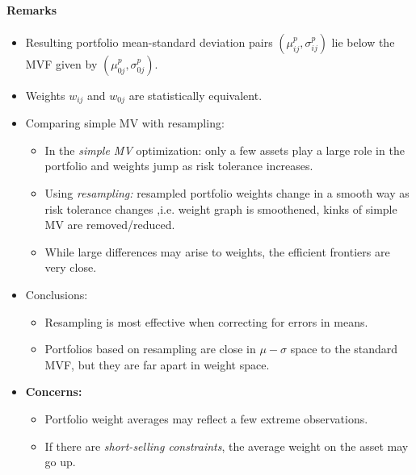 \documentclass[a4paper,landscape,8pt,fleqn]{scrartcl}
\renewcommand{\emph}[1]{\textbf{#1}}
\begin{document}
\begin{multicols*}{3}
\paragraph{Remarks}
\begin{itemize}
\item Resulting portfolio mean-standard deviation pairs $(\mu_{ij}^p, \sigma_{ij}^p)$ lie below the MVF given by $(\mu_{0j}^p, \sigma_{0j}^p)$.
\item Weights $w_{ij}$ and $w_{0j}$ are statistically equivalent.
\item Comparing simple MV with resampling:
\begin{itemize}
\item In the \textit{simple MV} optimization: only a few assets play a large role in the portfolio and weights jump as risk tolerance increases.
\item Using \textit{resampling:} resampled portfolio weights change in a smooth way as risk tolerance changes ,i.e. weight graph is smoothened, kinks of simple MV are removed/reduced.
\item While large differences may arise to weights, the efficient frontiers are very close.
\end{itemize}
\item Conclusions:
\begin{itemize}
\item Resampling is most effective when correcting for errors in means.
\item Portfolios based on resampling are close in $\mu-\sigma$ space to the standard MVF, but they are far apart in weight space.
\end{itemize}
\item \emph{Concerns:}
\begin{itemize}
\item Portfolio weight averages may reflect a few extreme observations.
\item If there are \textit{short-selling constraints}, the average weight on the asset may go up.
\end{itemize}
\end{itemize}


\end{multicols*}
\end{document}
